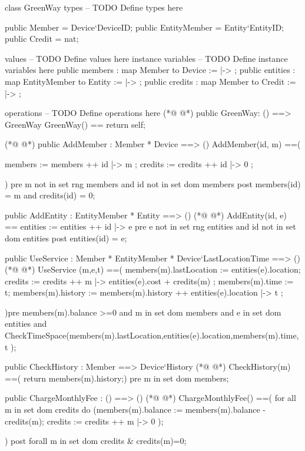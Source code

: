 \begin{vdmpp}
class GreenWay
types
-- TODO Define types here

 public Member = Device`DeviceID;
 public EntityMember = Entity`EntityID;
 public Credit = nat;
 
values
-- TODO Define values here
instance variables
-- TODO Define instance variables here
 public members : map Member to Device := { |-> };
 public entities : map EntityMember to Entity := { |-> };
 public credits : map Member to Credit := { |-> };
 
operations
-- TODO Define operations here
(*@
\label{GreenWay:19}
@*)
 public GreenWay: () ==> GreenWay
  GreenWay() == 
   return self;
   
   
(*@
\label{AddMember:24}
@*)
 public AddMember : Member * Device ==> ()
 AddMember(id, m) ==(

   members := members ++ { id |-> m };
   credits := credits ++ { id |-> 0 };   
   
   )
   pre m not in set rng members and id not in set dom members
   post members(id) = m and credits(id) = 0;
   
   
 public AddEntity : EntityMember * Entity ==> ()
(*@
\label{AddEntity:36}
@*)
 AddEntity(id, e) ==
   entities := entities ++ { id |-> e }
   pre e not in set rng entities and id not in set dom entities
   post entities(id) = e;  

 public UseService : Member * EntityMember * Device`LastLocationTime ==> ()
(*@
\label{UseService:42}
@*)
 UseService (m,e,t) ==(
  members(m).lastLocation := entities(e).location;
  credits := credits ++ { m |-> entities(e).cost + credits(m) };
  members(m).time := t;   
  members(m).history := members(m).history ++ {entities(e).location |-> t} ;
 
 )pre members(m).balance >=0 
 and m in set dom members
 and e in set dom entities
 and CheckTimeSpace(members(m).lastLocation,entities(e).location,members(m).time, t );
 

 public CheckHistory : Member ==> Device`History 
(*@
\label{CheckHistory:55}
@*)
 CheckHistory(m) ==(
  return members(m).history;)
  pre m in set dom members;

 
 public ChargeMonthlyFee : () ==> ()
(*@
\label{ChargeMonthlyFee:61}
@*)
 ChargeMonthlyFee() ==(
  for all m in set dom credits do
  (members(m).balance := members(m).balance - credits(m);
  credits := credits ++ {m |-> 0} ); 
  
 )
 post forall m in set dom credits & credits(m)=0;
 

\end{vdmpp}
